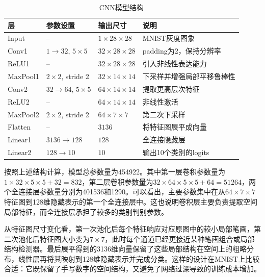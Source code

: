 \documentclass[11pt]{article}
\begin{document}
	\begin{table}[H]
		\centering
		\caption{CNN模型结构}
		\begin{tabular}{M{3.2cm} M{3.2cm} M{3.2cm} M{4.8cm}}
			\toprule
			层 & 参数设置 & 输出尺寸 & 说明 \\
			\midrule
			Input & -- & $1\times 28\times 28$ & MNIST灰度图象 \\
			Conv1 & $1\rightarrow 32$, $5\times 5$ & $32\times 28\times 28$ & padding为2，保持分辨率 \\
			ReLU1 & -- & $32\times 28\times 28$ & 引入非线性表达能力 \\
			MaxPool1 & $2\times 2$, stride 2 & $32\times 14\times 14$ & 下采样并增强局部平移鲁棒性 \\
			Conv2 & $32\rightarrow 64$, $5\times 5$ & $64\times 14\times 14$ & 提取更高层次特征 \\
			ReLU2 & -- & $64\times 14\times 14$ & 非线性激活 \\
			MaxPool2 & $2\times 2$, stride 2 & $64\times 7\times 7$ & 第二次下采样 \\
			Flatten & -- & $3136$ & 将特征图展平成向量 \\
			Linear1 & $3136\rightarrow 128$ & $128$ & 全连接隐藏层 \\
			Linear2 & $128\rightarrow 10$ & $10$ & 输出10个类别的logits \\
			\bottomrule
		\end{tabular}
	\end{table}

	按照上述结构计算，模型总参数量为454922。其中第一层卷积参数量为$1\times 32\times 5\times 5+32=832$，第二层卷积参数量为$32\times 64\times 5\times 5+64=51264$，两个全连接层参数量分别为401536和1290。可以看出，主要参数集中在从$64\times 7\times 7$特征图到128维隐藏表示的第一个全连接层中。这也说明卷积层主要负责提取空间局部特征，而全连接层承担了较多的类别判别参数。

	从特征图尺寸变化看，第一次池化后每个特征响应对应原图中的较小局部笔画，第二次池化后特征图大小变为$7\times7$，此时每个通道已经更接近某种笔画组合或局部结构检测器。最后展平得到的3136维向量保留了这些局部结构在空间上的粗略分布，线性层再将其映射到128维隐藏表示并完成分类。这样的设计在MNIST上比较合适：它既保留了手写数字的空间结构，又避免了网络过深导致的训练成本增加。
\end{document}
